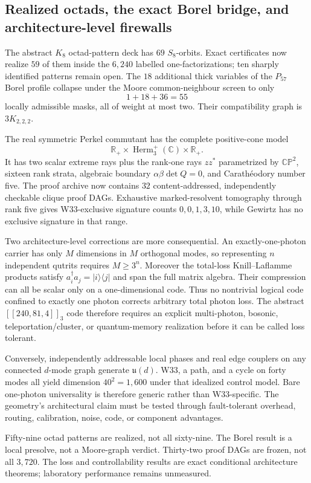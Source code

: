 \subsection{Realized octads, the exact Borel bridge, and architecture-level firewalls}
\label{sec:pass3687-3693}

The abstract $K_8$ octad-pattern deck has $69$ $S_8$-orbits. Exact certificates now realize $59$ of them inside the $6,240$ labelled one-factorizations; ten sharply identified patterns remain open. The $18$ additional thick variables of the $P_{57}$ Borel profile collapse under the Moore common-neighbour screen to only
\[
1+18+36=55
\]
locally admissible masks, all of weight at most two. Their compatibility graph is $3K_{2,2,2}$.

The real symmetric Perkel commutant has the complete positive-cone model
\[
\mathbb R_+\times\operatorname{Herm}_3^+(\mathbb C)\times\mathbb R_+.
\]
It has two scalar extreme rays plus the rank-one rays $zz^*$ parametrized by $\mathbb{CP}^2$, sixteen rank strata, algebraic boundary $\alpha\beta\det Q=0$, and Carath\'eodory number five. The proof archive now contains $32$ content-addressed, independently checkable clique proof DAGs. Exhaustive marked-resolvent tomography through rank five gives W33-exclusive signature counts $0,0,1,3,10$, while Gewirtz has no exclusive signature in that range.

Two architecture-level corrections are more consequential. An exactly-one-photon carrier has only $M$ dimensions in $M$ orthogonal modes, so representing $n$ independent qutrits requires $M\ge3^n$. Moreover the total-loss Knill--Laflamme products satisfy $a_i^\dagger a_j=|i\rangle\!\langle j|$ and span the full matrix algebra. Their compression can all be scalar only on a one-dimensional code. Thus no nontrivial logical code confined to exactly one photon corrects arbitrary total photon loss. The abstract $[[240,81,4]]_3$ code therefore requires an explicit multi-photon, bosonic, teleportation/cluster, or quantum-memory realization before it can be called loss tolerant.

Conversely, independently addressable local phases and real edge couplers on any connected $d$-mode graph generate $\mathfrak u(d)$. W33, a path, and a cycle on forty modes all yield dimension $40^2=1,600$ under that idealized control model. Bare one-photon universality is therefore generic rather than W33-specific. The geometry's architectural claim must be tested through fault-tolerant overhead, routing, calibration, noise, code, or component advantages.

\begin{tcolorbox}[title=Evidence boundary]
Fifty-nine octad patterns are realized, not all sixty-nine. The Borel result is a local presolve, not a Moore-graph verdict. Thirty-two proof DAGs are frozen, not all $3,720$. The loss and controllability results are exact conditional architecture theorems; laboratory performance remains unmeasured.
\end{tcolorbox}
